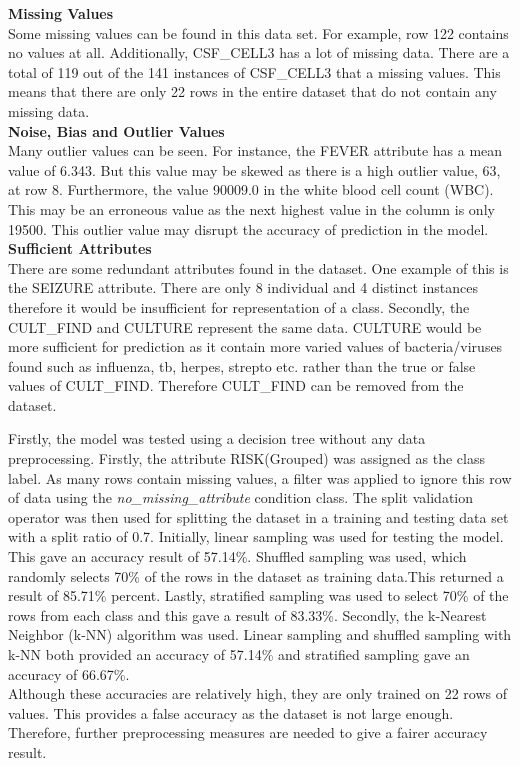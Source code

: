 \textbf{Missing Values}\\
Some missing values can be found in this data set. For example, row 122 contains no values at all. Additionally, CSF\_CELL3 has a lot of missing data. There are a total of 119 out of the 141 instances of CSF\_CELL3 that a missing values. This means that there are only 22 rows in the entire dataset that do not contain any missing data. \\
\textbf{Noise, Bias and Outlier Values}\\
Many outlier values can be seen. For instance, the FEVER attribute has a mean value of 6.343. But this value may be skewed as there is a high outlier value, 63, at row 8. Furthermore, the value 90009.0 in the white blood cell count (WBC). This may be an erroneous value as the next highest value in the column is only 19500. This outlier value may disrupt the accuracy of prediction in the model.\\
\textbf{Sufficient Attributes}\\
There are some redundant attributes found in the dataset. One example of this is the SEIZURE attribute. There are only 8 individual and 4 distinct instances therefore it would be insufficient for representation of a class. Secondly, the CULT\_FIND and CULTURE represent the same data. CULTURE would be more sufficient for prediction as it contain more varied values of bacteria/viruses found such as influenza, tb, herpes, strepto etc. rather than the true or false values of CULT\_FIND. Therefore CULT\_FIND can be removed from the dataset.



Firstly, the model was tested using a decision tree without any data preprocessing. Firstly, the attribute RISK(Grouped) was assigned as the class label. As many rows contain missing values, a filter was applied to ignore this row of data using the \textit{no\_missing\_attribute} condition class. The split validation operator was then used for splitting the dataset in a training and testing data set with a split ratio of 0.7. Initially, linear sampling was used for testing the model. This gave an accuracy result of 57.14\%. Shuffled sampling was used, which randomly selects 70\% of the rows in the dataset as training data.This returned a result of 85.71\% percent. Lastly, stratified sampling was used to select 70\% of the rows from each class and this gave a result of 83.33\%. Secondly, the k-Nearest Neighbor (k-NN) algorithm was used. Linear sampling and shuffled sampling with k-NN both provided an accuracy of 57.14\% and stratified sampling gave an accuracy of 66.67\%.
\\Although these accuracies are relatively high, they are only trained on 22 rows of values. This provides a false accuracy as the dataset is not large enough. Therefore, further preprocessing measures are needed to give a fairer accuracy result.



